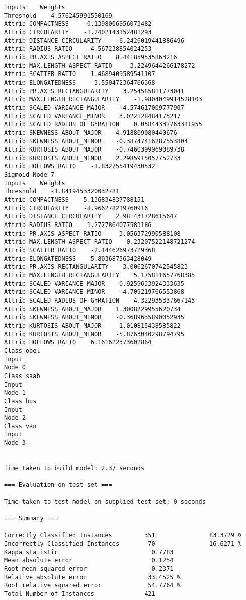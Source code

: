 \documentclass[
	article,			%
	11pt,				%
	oneside,			%
	a4paper,			%
	english,			%
	brazil,				%
	sumario=tradicional
	]{abntex2}
\begin{document}
\begin{lstlisting}
Inputs    Weights
Threshold    4.576245991550169
Attrib COMPACTNESS    -0.1398006956073482
Attrib CIRCULARITY    -1.2402143152481293
Attrib DISTANCE CIRCULARITY    -6.2426019441886496
Attrib RADIUS RATIO    -4.567238854024253
Attrib PR.AXIS ASPECT RATIO    8.441859535863216
Attrib MAX.LENGTH ASPECT RATIO    -3.2249644266178272
Attrib SCATTER RATIO    1.4689409589541107
Attrib ELONGATEDNESS    -3.550472364766368
Attrib PR.AXIS RECTANGULARITY    3.254585811773041
Attrib MAX.LENGTH RECTANGULARITY    -1.9804049914528103
Attrib SCALED VARIANCE_MAJOR    -4.574617009777907
Attrib SCALED VARIANCE_MINOR    3.022128484175217
Attrib SCALED RADIUS OF GYRATION    0.05844337763311955
Attrib SKEWNESS ABOUT_MAJOR    4.918809080440676
Attrib SKEWNESS ABOUT_MINOR    -0.38747416287553804
Attrib KURTOSIS ABOUT_MAJOR    -0.7460399969089738
Attrib KURTOSIS ABOUT_MINOR    2.2985915057752733
Attrib HOLLOWS RATIO    -1.832755419430532
Sigmoid Node 7
Inputs    Weights
Threshold    -1.8419453320032781
Attrib COMPACTNESS    5.136834837788151
Attrib CIRCULARITY    -8.966278219760916
Attrib DISTANCE CIRCULARITY    2.981431728615647
Attrib RADIUS RATIO    1.2727864077583186
Attrib PR.AXIS ASPECT RATIO    -3.056372990588108
Attrib MAX.LENGTH ASPECT RATIO    0.23207522148721274
Attrib SCATTER RATIO    -2.144626973729368
Attrib ELONGATEDNESS    5.803687563428049
Attrib PR.AXIS RECTANGULARITY    3.0062670742545823
Attrib MAX.LENGTH RECTANGULARITY    5.175811657768385
Attrib SCALED VARIANCE_MAJOR    0.9259633924333635
Attrib SCALED VARIANCE_MINOR    -4.709219766553868
Attrib SCALED RADIUS OF GYRATION    4.322935337667145
Attrib SKEWNESS ABOUT_MAJOR    1.3008229955620734
Attrib SKEWNESS ABOUT_MINOR    -0.3689635890052935
Attrib KURTOSIS ABOUT_MAJOR    -1.010815438585822
Attrib KURTOSIS ABOUT_MINOR    -5.8763040298794795
Attrib HOLLOWS RATIO    6.161622373602864
Class opel
Input
Node 0
Class saab
Input
Node 1
Class bus
Input
Node 2
Class van
Input
Node 3


Time taken to build model: 2.37 seconds

=== Evaluation on test set ===

Time taken to test model on supplied test set: 0 seconds

=== Summary ===

Correctly Classified Instances         351               83.3729 %
Incorrectly Classified Instances        70               16.6271 %
Kappa statistic                          0.7783
Mean absolute error                      0.1254
Root mean squared error                  0.2371
Relative absolute error                 33.4525 %
Root relative squared error             54.7764 %
Total Number of Instances              421     


\end{lstlisting}
\end{document}
